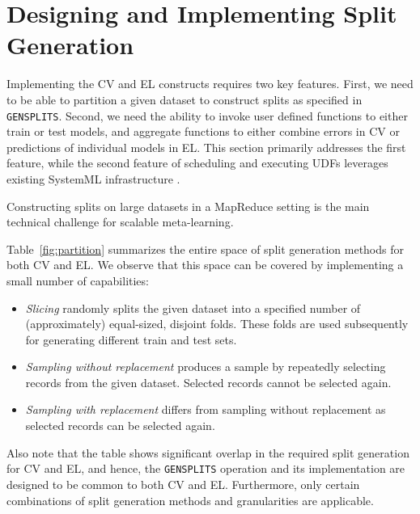 \documentclass{vldb}
\begin{document}

\section{Designing and Implementing Split Generation}
\label{sec:design}

Implementing the CV and EL constructs requires two key features.
First, we need to be able to partition a given dataset to construct splits
as specified in {\tt GENSPLITS}.
Second, we need the ability to invoke user defined functions
to either train or test models, and aggregate functions to either
combine errors in CV or predictions of individual models in EL.
This section primarily addresses the first feature,
while the second feature of scheduling and executing UDFs
leverages existing SystemML infrastructure \cite{systemml}.

Constructing splits on large datasets in a MapReduce setting
is the main technical challenge for scalable meta-learning.

Table~\ref{fig:partition} summarizes the entire space of
split generation methods for both CV and EL.
We observe that this space can be covered by implementing a small
number of capabilities:

\begin{itemize}
\item \emph{Slicing} randomly splits the given dataset into a specified number of
    (approximately) equal-sized, disjoint folds. These folds are used subsequently
    for generating different train and test sets.

\item \emph{Sampling without replacement} produces a sample by repeatedly
    selecting records from the given dataset. Selected records cannot be selected again.

\item \emph{Sampling with replacement} differs from sampling without replacement as selected
    records can be selected again.
\end{itemize}

Also note that the table shows significant overlap in the required split generation for
CV and EL, and hence, the {\tt GENSPLITS} operation and its implementation
are designed to be common to both CV and EL.
Furthermore, only certain combinations of split generation methods and granularities are applicable.
\end{document}
